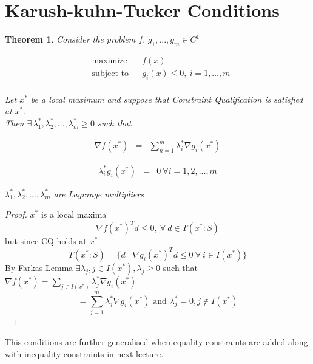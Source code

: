 \documentclass[twoside]{article}
\newcounter{lecnum}
\newtheorem{theorem}{Theorem}[lecnum]
\DeclareMathOperator{\subjectto}{subject\ to}
\begin{document}
\section{Karush-kuhn-Tucker Conditions}
\begin{theorem}
Consider the problem $f,\,g_1,...,g_m \in C^{1}$ 

\begin{equation*}
\begin{aligned}
& \text{maximize} && f(x)\\
& \subjectto && g_i(x) \leq 0,\ i=1, \ldots, m\\
\end{aligned}
\end{equation*}

Let $x^*$ be a local maximum and suppose that Constraint Qualification is satisfied at $x^*$.\\
Then $ \exists \, \lambda_1^*,\lambda_2^*,...,\lambda_m^* \geq 0 $ such that 

\begin{equation}
\begin{aligned}
\nabla f(x^*) & =& \sum_{n=1}^{m} \lambda_i^* \nabla g_i(x^*)
\end{aligned}
\end{equation}

\begin{equation}
\begin{aligned}
\lambda_i^*g_i(x^*) & = & 0 \ \forall i = 1,2,...,m 
\end{aligned}
\end{equation}

 $  \lambda_1^*,\lambda_2^*,...,\lambda_m^* $ are Lagrange multipliers
\end{theorem}

\begin{proof}
$x^* $ is a local maxima\\
$$\nabla f(x^*)^{T}d \leq 0,\ \forall \  d\in T(x^*:S)$$
but since CQ holds at $x^*$
$$T(x^*:S) = \{ d \mid \nabla g_i(x^*)^{T}d \leq 0\  \forall\  i \in I(x^*)\}$$
By Farkas Lemma $\exists \lambda_j, j \in I(x^*),\lambda_j \geq 0 $ such that $\nabla f(x^*) = \sum_{j\in I(x^*)} \lambda_j^* \nabla g_i(x^*)$\\
$$ =\sum_{j=1}^m \lambda_j^* \nabla g_i(x^*)\text{ and }\lambda_j^* = 0 , j\notin I(x^*)$$
\end{proof}

This conditions are further generalised when equality constraints are added along with inequality constraints in next lecture.
\end{document}
